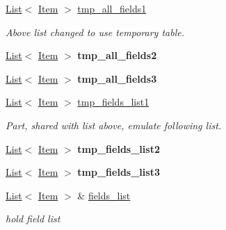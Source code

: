 \begin{DoxyCompactItemize}
\item 
\mbox{\label{classJOIN_aced73f1c43be033f6ec2bd414b5d23a4}} 
\mbox{\hyperlink{classList}{List}}$<$ \mbox{\hyperlink{classItem}{Item}} $>$ \mbox{\hyperlink{classJOIN_aced73f1c43be033f6ec2bd414b5d23a4}{tmp\+\_\+all\+\_\+fields1}}
\begin{DoxyCompactList}\small\item\em Above list changed to use temporary table. \end{DoxyCompactList}\item 
\mbox{\label{classJOIN_aa6588df86c19bbd48cf01bbad7985688}} 
\mbox{\hyperlink{classList}{List}}$<$ \mbox{\hyperlink{classItem}{Item}} $>$ {\bfseries tmp\+\_\+all\+\_\+fields2}
\item 
\mbox{\label{classJOIN_a8570de35c855f909fc99851a7f2173b2}} 
\mbox{\hyperlink{classList}{List}}$<$ \mbox{\hyperlink{classItem}{Item}} $>$ {\bfseries tmp\+\_\+all\+\_\+fields3}
\item 
\mbox{\label{classJOIN_a522b145c66767b34d18f4ffa52ba5aab}} 
\mbox{\hyperlink{classList}{List}}$<$ \mbox{\hyperlink{classItem}{Item}} $>$ \mbox{\hyperlink{classJOIN_a522b145c66767b34d18f4ffa52ba5aab}{tmp\+\_\+fields\+\_\+list1}}
\begin{DoxyCompactList}\small\item\em Part, shared with list above, emulate following list. \end{DoxyCompactList}\item 
\mbox{\label{classJOIN_a21042a46f616775109f191a6d9006498}} 
\mbox{\hyperlink{classList}{List}}$<$ \mbox{\hyperlink{classItem}{Item}} $>$ {\bfseries tmp\+\_\+fields\+\_\+list2}
\item 
\mbox{\label{classJOIN_a65fed4e7e961345b7f4dfaaaeb6d731d}} 
\mbox{\hyperlink{classList}{List}}$<$ \mbox{\hyperlink{classItem}{Item}} $>$ {\bfseries tmp\+\_\+fields\+\_\+list3}
\item 
\mbox{\label{classJOIN_ac17a879dfb3c22c1e1701d5f8d7bafd8}} 
\mbox{\hyperlink{classList}{List}}$<$ \mbox{\hyperlink{classItem}{Item}} $>$ \& \mbox{\hyperlink{classJOIN_ac17a879dfb3c22c1e1701d5f8d7bafd8}{fields\+\_\+list}}
\begin{DoxyCompactList}\small\item\em hold field list \end{DoxyCompactList}\item 

\end{DoxyCompactItemize}
